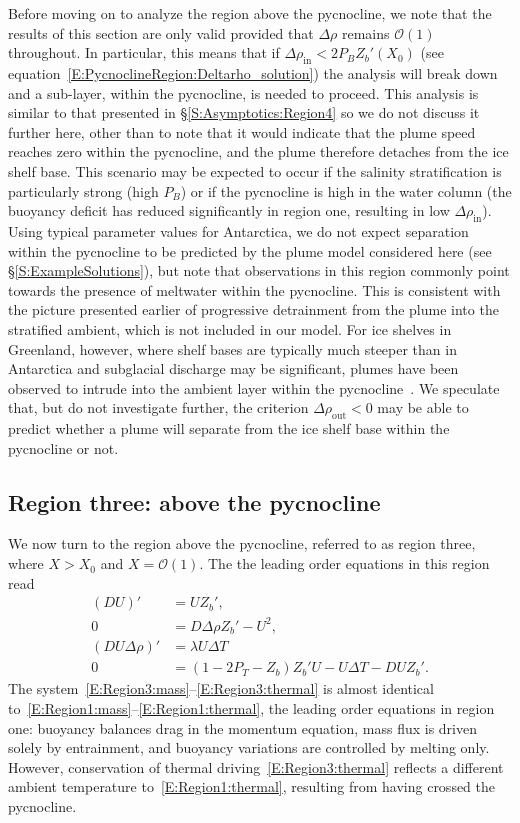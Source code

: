 \documentclass{jfm}
\newcommand{\order}[1]{\mathcal{O}(#1)}
\newcommand{\Pb}{\textit{P}_B}  %
\newcommand{\Pt}{\textit{P}_T}
\renewcommand{\in}{\text{in}} %
\newcommand{\out}{\text{out}}
\begin{document}
Before moving on to analyze the  region above the pycnocline, we note that the results of this section are only valid provided that $\Delta \rho$ remains $\order{1}$ throughout. In particular, this means that if $\Delta \rho_{\in} < 2 \Pb Z_b'(X_0)$ (see equation~\eqref{E:PycnoclineRegion:Deltarho_solution}) the analysis will break down and a sub-layer, within the pycnocline, is needed to proceed. This analysis is similar to that presented in \S\ref{S:Asymptotics:Region4} so we do not discuss it further here, other than to note that it would indicate that the plume speed reaches zero within the pycnocline, and the plume therefore detaches from the ice shelf base. This scenario may be expected to occur if the salinity stratification is particularly strong (high $\Pb$) or if the pycnocline is high in the water column (the buoyancy deficit has reduced significantly in region one, resulting in low $\Delta \rho_{\in}$). Using typical parameter values for Antarctica, we do not expect separation within the pycnocline to be predicted by the plume model considered here (see \S\ref{S:ExampleSolutions}), but note that observations in this region commonly point towards the presence of meltwater within the pycnocline. This is consistent with the picture presented earlier of progressive detrainment from the plume into the stratified ambient, which is not included in our model. For ice shelves in Greenland, however, where shelf bases are typically much steeper than in Antarctica and subglacial discharge may be significant, plumes have been observed to intrude into the ambient layer within the pycnocline~\citep{Straneo2011NatureGeo}. We speculate that, but do not investigate further, the criterion $\Delta \rho_\out < 0$  may be able to predict whether a plume will separate from the ice shelf base within the pycnocline or not.

\subsection{Region three: above the pycnocline}\label{S:Asymptotics:Region3}
We now turn to the region above the pycnocline, referred to as region three, where $X > X_0$ and $X = \order{1}$. The the leading order equations in this region read
\begin{align}
 (DU)' &= U Z_b',\label{E:Region3:mass}\\
0 &= D \Delta \rho Z_b' - U^2, \label{E:Region3:mom}\\
(DU\Delta \rho)'  &=\lambda U \Delta T\label{E:Region3:buoyancy}\\
0&= (1  - 2\Pt -  Z_b)Z_b'U- U\Delta T - DU Z_b'.\label{E:Region3:thermal}
\end{align}
The system~\eqref{E:Region3:mass}--\eqref{E:Region3:thermal} is almost identical to~\eqref{E:Region1:mass}--\eqref{E:Region1:thermal}, the leading order equations in region one: buoyancy balances drag in the momentum equation, mass flux is driven solely by entrainment, and buoyancy variations are controlled by melting only. However, conservation of thermal driving~\eqref{E:Region3:thermal} reflects a different ambient temperature to~\eqref{E:Region1:thermal}, resulting from having crossed the pycnocline.
\end{document}

